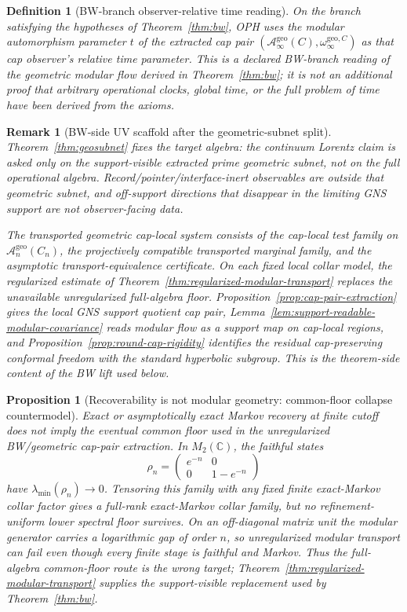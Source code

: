 \documentclass[11pt]{article}
\newtheorem{proposition}[theorem]{Proposition}
\newtheorem{definition}[theorem]{Definition}
\newtheorem{remark}[theorem]{Remark}
\begin{document}
\begin{definition}[BW-branch observer-relative time reading]\label{def:modulartime}
On the branch satisfying the hypotheses of Theorem~\ref{thm:bw}, OPH uses the modular
automorphism parameter \(t\) of the extracted cap pair
\((\mathcal A_\infty^{\mathrm{geo}}(C),\omega_\infty^{\mathrm{geo},C})\) as that cap
observer's relative time parameter. This is a declared BW-branch reading of the geometric
modular flow derived in Theorem~\ref{thm:bw}; it is not an additional proof that arbitrary
operational clocks, global time, or the full problem of time have been derived from the axioms.
\end{definition}

\begin{remark}[BW-side UV scaffold after the geometric-subnet split]
Theorem~\ref{thm:geosubnet} fixes the target algebra: the continuum Lorentz claim is asked only on the support-visible extracted prime geometric subnet, not on the full operational algebra. Record/pointer/interface-inert observables are outside that geometric subnet, and off-support directions that disappear in the limiting GNS support are not observer-facing data.

The transported geometric cap-local system consists of the cap-local test family on \(\mathcal A_n^{\mathrm{geo}}(C_n)\), the projectively compatible transported marginal family, and the asymptotic transport-equivalence certificate. On each fixed local collar model, the regularized estimate of Theorem~\ref{thm:regularized-modular-transport} replaces the unavailable unregularized full-algebra floor. Proposition~\ref{prop:cap-pair-extraction} gives the local GNS support quotient cap pair, Lemma~\ref{lem:support-readable-modular-covariance} reads modular flow as a support map on cap-local regions, and Proposition~\ref{prop:round-cap-rigidity} identifies the residual cap-preserving conformal freedom with the standard hyperbolic subgroup. This is the theorem-side content of the BW lift used below.
\end{remark}

\begin{proposition}[Recoverability is not modular geometry: common-floor collapse countermodel]\label{prop:commonfloor-collapse}
Exact or asymptotically exact Markov recovery at finite cutoff does not imply the eventual common floor used in the unregularized BW/geometric cap-pair extraction. In \(M_2(\mathbb C)\), the faithful states
\[
\rho_n=\begin{pmatrix}e^{-n}&0\\0&1-e^{-n}\end{pmatrix}
\]
have \(\lambda_{\min}(\rho_n)\to0\). Tensoring this family with any fixed finite exact-Markov collar factor gives a full-rank exact-Markov collar family, but no refinement-uniform lower spectral floor survives. On an off-diagonal matrix unit the modular generator carries a logarithmic gap of order \(n\), so unregularized modular transport can fail even though every finite stage is faithful and Markov. Thus the full-algebra common-floor route is the wrong target; Theorem~\ref{thm:regularized-modular-transport} supplies the support-visible replacement used by Theorem~\ref{thm:bw}.
\end{proposition}
\end{document}
